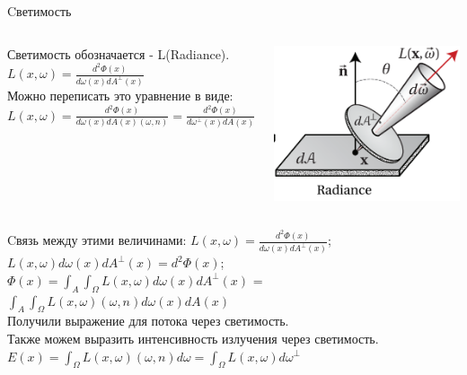 \documentclass{beamer}
\begin{document}
\begin{frame}{Cветимость}
	\begin{columns}
			Светимость обозначается - L(Radiance).\\ $L(x, \omega) = \frac{d^2\Phi(x)}{d\omega(x)dA^{\perp}(x)}$ \\ Можно переписать это уравнение в виде: \\$L(x, \omega) = \frac{d^2\Phi(x)}{d\omega(x)dA(x)(\omega, n)} = \frac{d^2\Phi(x)}{d\omega^{\perp}(x)dA(x)}$ 
		
			\includegraphics[width=\linewidth]{Radiance.png}
	\end{columns}
\end{frame}

\begin{frame}{Cвязь между этими величинами:}
	$L(x, \omega) = \frac{d^2\Phi(x)}{d\omega(x)dA^{\perp}(x)}$;\\ $L(x, \omega)d\omega(x)dA^{\perp}(x) = d^2\Phi(x)$;\\ $\Phi(x) = \int_A \int_{\Omega} L(x, \omega)d\omega(x)dA^{\perp}(x)$ = $\int_A \int_{\Omega} L(x, \omega)(\omega, n)d\omega(x)dA(x)$ \\ Получили выражение для потока через светимость. \\ 
	Также можем выразить интенсивность излучения через светимость. \\
	$E(x) = \int_{\Omega}L(x,\omega)(\omega, n)d\omega = \int_{\Omega}L(x, \omega)d\omega^{\perp}$
	
\end{frame}
\end{document}
